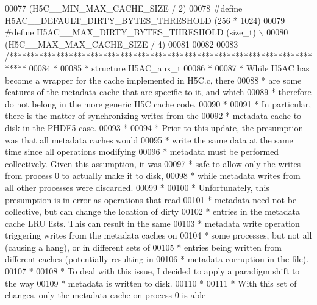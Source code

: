 \begin{DoxyCode}
00077 \textcolor{preprocessor}{                        (H5C\_\_MIN\_MAX\_CACHE\_SIZE / 2)}
00078 \textcolor{preprocessor}{#define H5AC\_\_DEFAULT\_DIRTY\_BYTES\_THRESHOLD (256 * 1024)}
00079 \textcolor{preprocessor}{#define H5AC\_\_MAX\_DIRTY\_BYTES\_THRESHOLD     (size\_t) \(\backslash\)}
00080 \textcolor{preprocessor}{                        (H5C\_\_MAX\_MAX\_CACHE\_SIZE / 4)}
00081 
00082 
00083 \textcolor{comment}{/****************************************************************************}
00084 \textcolor{comment}{ *}
00085 \textcolor{comment}{ * structure H5AC\_aux\_t}
00086 \textcolor{comment}{ *}
00087 \textcolor{comment}{ * While H5AC has become a wrapper for the cache implemented in H5C.c, there}
00088 \textcolor{comment}{ * are some features of the metadata cache that are specific to it, and which}
00089 \textcolor{comment}{ * therefore do not belong in the more generic H5C cache code.}
00090 \textcolor{comment}{ *}
00091 \textcolor{comment}{ * In particular, there is the matter of synchronizing writes from the}
00092 \textcolor{comment}{ * metadata cache to disk in the PHDF5 case.}
00093 \textcolor{comment}{ *}
00094 \textcolor{comment}{ * Prior to this update, the presumption was that all metadata caches would}
00095 \textcolor{comment}{ * write the same data at the same time since all operations modifying}
00096 \textcolor{comment}{ * metadata must be performed collectively.  Given this assumption, it was}
00097 \textcolor{comment}{ * safe to allow only the writes from process 0 to actually make it to disk,}
00098 \textcolor{comment}{ * while metadata writes from all other processes were discarded.}
00099 \textcolor{comment}{ *}
00100 \textcolor{comment}{ * Unfortunately, this presumption is in error as operations that read}
00101 \textcolor{comment}{ * metadata need not be collective, but can change the location of dirty}
00102 \textcolor{comment}{ * entries in the metadata cache LRU lists.  This can result in the same}
00103 \textcolor{comment}{ * metadata write operation triggering writes from the metadata caches on}
00104 \textcolor{comment}{ * some processes, but not all (causing a hang), or in different sets of}
00105 \textcolor{comment}{ * entries being written from different caches (potentially resulting in}
00106 \textcolor{comment}{ * metadata corruption in the file).}
00107 \textcolor{comment}{ *}
00108 \textcolor{comment}{ * To deal with this issue, I decided to apply a paradigm shift to the way}
00109 \textcolor{comment}{ * metadata is written to disk.}
00110 \textcolor{comment}{ *}
00111 \textcolor{comment}{ * With this set of changes, only the metadata cache on process 0 is able}

\end{DoxyCode}

